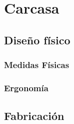\chapter{Carcasa}

\section{Diseño físico}
\subsection{Medidas Físicas}
\subsection{Ergonomía}
\section{Fabricación}